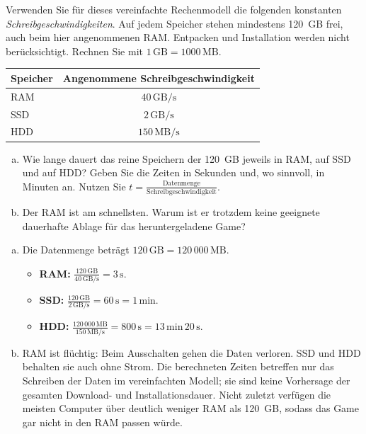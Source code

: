 \begin{myexercise}
    Verwenden Sie für dieses vereinfachte Rechenmodell die folgenden konstanten \emph{Schreibgeschwindigkeiten}. Auf jedem Speicher stehen mindestens 120~GB frei, auch beim hier angenommenen \gls{RAM}. Entpacken und Installation werden nicht berücksichtigt. Rechnen Sie mit $1\,\mathrm{GB}=1000\,\mathrm{MB}$.
    \begin{center}
        \begin{tabular}{lc}
            Speicher & Angenommene Schreibgeschwindigkeit \\ \midrule
            \gls{RAM} & $40\,\mathrm{GB/s}$ \\
            \gls{SSD} & $2\,\mathrm{GB/s}$ \\
            \gls{HDD} & $150\,\mathrm{MB/s}$ \\
        \end{tabular}
    \end{center}
    \begin{enumerate}[(a)]
        \item Wie lange dauert das reine Speichern der 120~GB jeweils in \gls{RAM}, auf \gls{SSD} und auf \gls{HDD}? Geben Sie die Zeiten in Sekunden und, wo sinnvoll, in Minuten an. Nutzen Sie $t=\frac{\text{Datenmenge}}{\text{Schreibgeschwindigkeit}}$.
        \item Der \gls{RAM} ist am schnellsten. Warum ist er trotzdem keine geeignete dauerhafte Ablage für das heruntergeladene Game?
    \end{enumerate}
    \begin{myanswer}
        \begin{enumerate}[(a)]
            \item Die Datenmenge beträgt $120\,\mathrm{GB}=120\,000\,\mathrm{MB}$.
            \begin{itemize}
                \item \textbf{\gls{RAM}:} $\frac{120\,\mathrm{GB}}{40\,\mathrm{GB/s}}=3\,\mathrm{s}$.
                \item \textbf{\gls{SSD}:} $\frac{120\,\mathrm{GB}}{2\,\mathrm{GB/s}}=60\,\mathrm{s}=1\,\mathrm{min}$.
                \item \textbf{\gls{HDD}:} $\frac{120\,000\,\mathrm{MB}}{150\,\mathrm{MB/s}}=800\,\mathrm{s}=13\,\mathrm{min}\,20\,\mathrm{s}$.
            \end{itemize}
            \item \gls{RAM} ist flüchtig: Beim Ausschalten gehen die Daten verloren. \gls{SSD} und \gls{HDD} behalten sie auch ohne Strom. Die berechneten Zeiten betreffen nur das Schreiben der Daten im vereinfachten Modell; sie sind keine Vorhersage der gesamten Download- und Installationsdauer. Nicht zuletzt verfügen die meisten Computer über deutlich weniger \gls{RAM} als 120~GB, sodass das Game gar nicht in den \gls{RAM} passen würde.
        \end{enumerate}
    \end{myanswer}
\end{myexercise}

